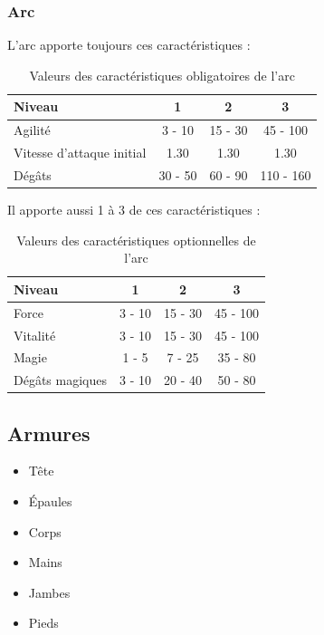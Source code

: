 \documentclass[11pt, a4paper, oneside]{report}
\begin{document}
\subsubsection{Arc}
L'arc apporte toujours ces caractéristiques :
\begin{table}[H]
\begin{center}
\begin{tabular}{| l | c | c | c |}
  \hline      
  Niveau 				& 1 & 2 & 3\\ \hline \hline
  Agilité 				& 3 - 10 & 15 - 30 & 45 - 100\\ \hline
  Vitesse d'attaque initial	& 1.30 & 1.30 & 1.30\\ \hline
  Dégâts 				& 30 - 50 & 60 - 90 & 110 - 160\\ \hline
\end{tabular}
\caption{Valeurs des caractéristiques obligatoires de l'arc}
\end{center}
\end{table}
Il apporte aussi 1 à 3 de ces caractéristiques :
\begin{table}[H]
\begin{center}
\begin{tabular}{| l | c | c | c |}
  \hline      
  Niveau 				& 1 & 2 & 3\\ \hline \hline                 
  Force 				& 3 - 10 & 15 - 30 & 45 - 100\\ \hline
  Vitalité 				& 3 - 10 & 15 - 30 & 45 - 100\\ \hline
  Magie 				& 1 - 5 & 7 - 25 & 35 - 80\\ \hline
  Dégâts magiques 		& 3 - 10 & 20 - 40 & 50 - 80\\ \hline
\end{tabular}
\caption{Valeurs des caractéristiques optionnelles de l'arc}
\end{center}
\end{table}
\subsection{Armures}
\begin{multicols}{2}
\begin{itemize}
    \item Tête
    \item Épaules
    \item Corps
    \item Mains
    \item Jambes
    \item Pieds
\end{itemize}
\end{multicols}
\end{document}
